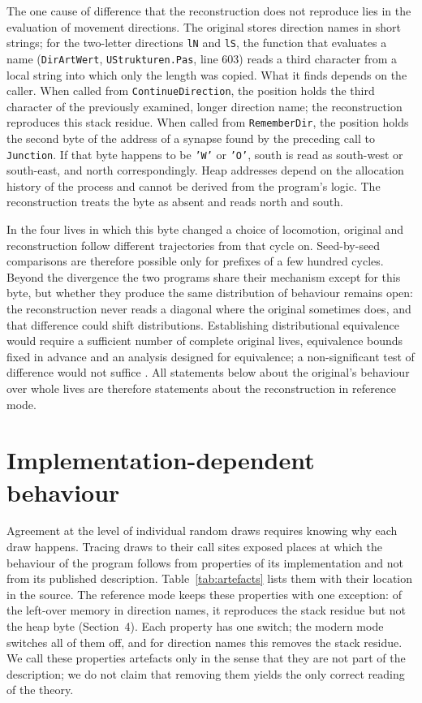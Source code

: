 \documentclass[preprint,12pt,authoryear]{elsarticle}
\newcommand{\code}[1]{\texttt{#1}}
\begin{document}
The one cause of difference that the reconstruction does not reproduce lies in the evaluation of movement directions. The original stores direction names in short strings; for the two-letter directions \code{lN} and \code{lS}, the function that evaluates a name (\code{DirArtWert}, \code{UStrukturen.Pas}, line 603) reads a third character from a local string into which only the length was copied. What it finds depends on the caller. When called from \code{ContinueDirection}, the position holds the third character of the previously examined, longer direction name; the reconstruction reproduces this stack residue. When called from \code{RememberDir}, the position holds the second byte of the address of a synapse found by the preceding call to \code{Junction}. If that byte happens to be \code{'W'} or \code{'O'}, south is read as south-west or south-east, and north correspondingly. Heap addresses depend on the allocation history of the process and cannot be derived from the program's logic. The reconstruction treats the byte as absent and reads north and south.

In the four lives in which this byte changed a choice of locomotion, original and reconstruction follow different trajectories from that cycle on. Seed-by-seed comparisons are therefore possible only for prefixes of a few hundred cycles. Beyond the divergence the two programs share their mechanism except for this byte, but whether they produce the same distribution of behaviour remains open: the reconstruction never reads a diagonal where the original sometimes does, and that difference could shift distributions. Establishing distributional equivalence would require a sufficient number of complete original lives, equivalence bounds fixed in advance and an analysis designed for equivalence; a non-significant test of difference would not suffice \citep{lakens2017equivalence}. All statements below about the original's behaviour over whole lives are therefore statements about the reconstruction in reference mode.

\section{Implementation-dependent behaviour}

Agreement at the level of individual random draws requires knowing why each draw happens. Tracing draws to their call sites exposed places at which the behaviour of the program follows from properties of its implementation and not from its published description. Table~\ref{tab:artefacts} lists them with their location in the source. The reference mode keeps these properties with one exception: of the left-over memory in direction names, it reproduces the stack residue but not the heap byte (Section~4). Each property has one switch; the modern mode switches all of them off, and for direction names this removes the stack residue. We call these properties artefacts only in the sense that they are not part of the description; we do not claim that removing them yields the only correct reading of the theory.
\end{document}
